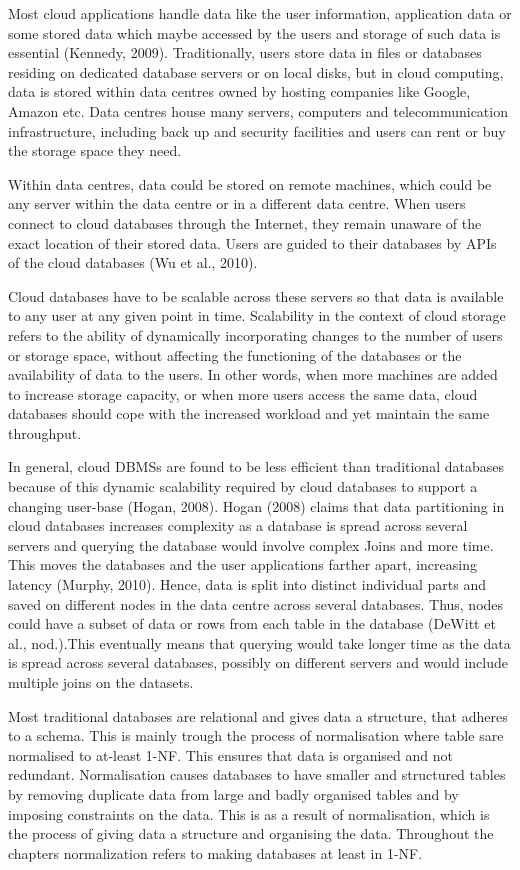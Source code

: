 Most cloud applications handle data like the user information, application data 
or some stored data which maybe accessed by the users and storage
of such data is essential (Kennedy, 2009). Traditionally, users store data
in files or databases residing on dedicated database servers or on local disks,
but in cloud computing, data is stored within data centres owned by hosting companies like Google, Amazon etc. Data centres house many servers,
computers and telecommunication infrastructure, including back up and security
facilities and users can rent or buy the storage space they need. 

Within data centres, data could be stored on remote machines, which could be
any server within the data centre or in a different data centre. When users
connect to cloud databases through the Internet, they remain unaware of
the exact location of their stored data.  Users are guided to their
databases by \acp{API} of the cloud databases (Wu et al., 2010). 

Cloud databases have to be scalable across these servers so that data is
available to any user at any given point in time. Scalability in the context of cloud storage refers to the ability of dynamically incorporating changes to the number
of users or storage space, without affecting the functioning of the databases or
the availability of data to the users. In other words, when more machines
are added to increase storage capacity, or when more users access the same data,
cloud databases should cope with the increased workload and yet maintain the
same throughput. 

In general, cloud \acp{DBMS} are found to be less efficient than traditional
databases because of this dynamic scalability required by cloud databases to
support a changing user-base (Hogan, 2008). Hogan (2008) claims that data
partitioning in cloud databases increases complexity as a database is spread
across several servers and querying the database would involve complex Joins and
more time. This moves the databases and the user applications farther apart,
increasing latency (Murphy, 2010). Hence, data is split into distinct individual
parts and saved on different nodes in the data centre across several databases. Thus, nodes could have a
subset of data or rows from each table in the database (DeWitt et al.,
nod.).This eventually means that querying would take longer time as the data is
spread across several databases, possibly on different servers and would include
multiple joins on the datasets.

Most traditional databases are relational and gives data a structure, that
adheres to a schema. This is mainly trough the process of normalisation  where
table sare normalised to at-least \ac{1-NF}. This ensures that data is organised
and not redundant. Normalisation causes databases to have smaller and structured
tables by removing duplicate data from large and badly organised tables and by
imposing constraints on the data. This is as a result of normalisation, which is
the process of giving data a structure and organising the data. Throughout the
chapters normalization refers to making databases at least in \ac{1-NF}.

